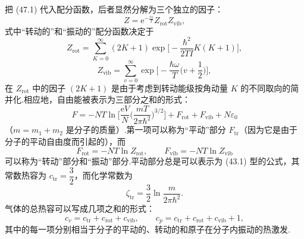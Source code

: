 把 (47.1) 代入配分函数，后者显然分解为三个独立的因子：
\begin{equation}
  Z=\mathrm{e}^{-\frac{\varepsilon_0}{T}}Z_{\mathrm{rot}}Z_{\mathrm{vib}},
\end{equation}
式中“转动的”和“振动的”配分函数决定于
\begin{equation}
  Z_{\mathrm{rot}}=\sum_{K=0}^{\infty}\left(2K+1\right)
  \exp\Big[-\frac{\hbar^2}{2TI}K(K+1)\Big],
\end{equation}
\begin{equation}
  Z_{\mathrm{vib}}=\sum_{v=0}^{\infty}
  \exp\Big[-\frac{\hbar\omega}{T}\Big(v+\frac{1}{2}\Big)\Big],
\end{equation}
在 $Z_{\mathrm{rot}}$ 中的因子 $(2K+1)$ 是由于考虑到转动能级按角动量 $K$ 的不同取向的简并化.相应地，自由能被表示为三部分之和的形式：
\begin{equation}
  F=-NT\ln\Big[\frac{\mathrm{e}V}{N}\Big(\frac{mT}{2\pi\hbar^2}\Big)^{3/2}\Big]
  +F_{\mathrm{rot}}+F_{\mathrm{vib}}+N\varepsilon_0
\end{equation}
（$m=m_1+m_2$ 是分子的质量）.第一项可以称为“平动”部分 $F_{\mathrm{tr}}$（因为它是由于分子的平动自由度而引起的），而
\begin{equation}
  F_{\mathrm{rot}}=-NT\ln Z_{\mathrm{rot}},\qquad
  F_{\mathrm{vib}}=-NT\ln Z_{\mathrm{vib}}
\end{equation}
可以称为“转动”部分和“振动”部分.平动部分总是可以表示为 (43.1) 型的公式，其常数热容为 $c_{\mathrm{tr}}=\dfrac{3}{2}$，而化学常数为
\begin{equation}
  \zeta_{\mathrm{tr}}=\frac{3}{2}\ln\frac{m}{2\pi\hbar^2}.
\end{equation}
气体的总热容可以写成几项之和的形式：
\begin{equation}
  c_v=c_{\mathrm{tr}}+c_{\mathrm{rot}}+c_{\mathrm{vib}},\qquad
  c_p=c_{\mathrm{tr}}+c_{\mathrm{rot}}+c_{\mathrm{vib}}+1,
\end{equation}
其中的每一项分别相当于分子的平动的、转动的和原子在分子内振动的热激发.

